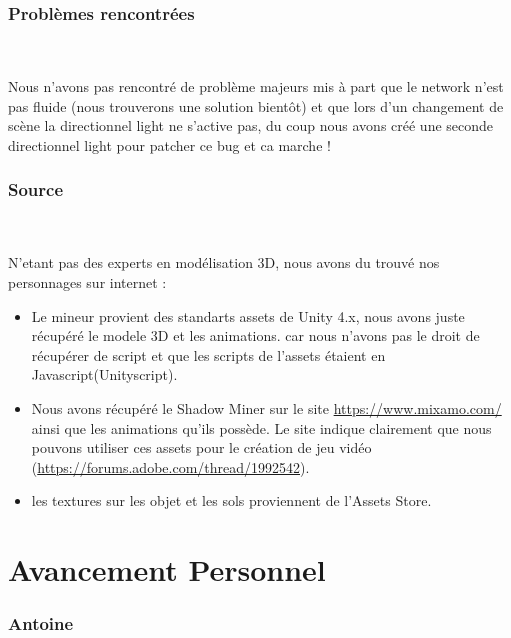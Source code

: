\documentclass[titlepage, 13px, a4paper]{article}
\begin{document}
\section{Problèmes rencontrées}
\paragraph{} \hspace{0pt} \\
Nous n'avons pas rencontré de problème majeurs mis à part que le network n'est pas fluide (nous trouverons une solution bientôt) 
et que lors d'un changement de scène la directionnel light ne s'active pas, du coup nous avons créé une seconde directionnel light pour patcher ce bug et ca marche !


\section{Source}
\paragraph{} \hspace{0pt} \\
N'etant pas des experts en modélisation 3D, nous avons du trouvé nos personnages sur internet : 
{\begin{itemize}
	\item Le mineur provient des standarts assets de Unity 4.x, nous avons juste récupéré le modele 3D et les animations. 
	car nous n'avons pas le droit de récupérer de script et que les scripts de l'assets étaient en Javascript(Unityscript).
	\item Nous avons récupéré le Shadow Miner sur le site \url{https://www.mixamo.com/} ainsi que les animations qu'ils possède.
	Le site indique clairement que nous pouvons utiliser ces assets pour le création de jeu vidéo (\url{https://forums.adobe.com/thread/1992542}).
	\item les textures sur les objet et les sols proviennent de l'Assets Store.
\end{itemize}}

\newpage

\part{Avancement Personnel}  
\section{Antoine}
\end{document}
